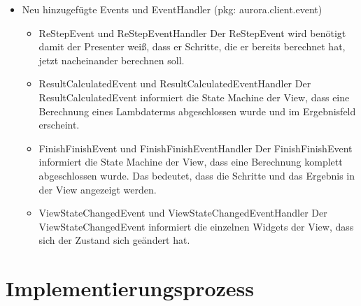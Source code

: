 \documentclass[parskip=full,11pt,twoside]{scrartcl}
\begin{document}
\begin{itemize}
    \item Neu hinzugefügte Events und EventHandler (pkg: aurora.client.event)
    	\begin{itemize}
    		\item ReStepEvent und ReStepEventHandler
    		\newline
    		Der ReStepEvent wird benötigt damit der Presenter weiß, dass er Schritte, die er bereits berechnet hat, jetzt nacheinander berechnen soll.

    		\item ResultCalculatedEvent und ResultCalculatedEventHandler
    		\newline
    		Der ResultCalculatedEvent informiert die State Machine der View, dass eine Berechnung eines Lambdaterms abgeschlossen wurde und im Ergebnisfeld erscheint.

    		\item FinishFinishEvent und FinishFinishEventHandler
    		\newline
    		Der FinishFinishEvent informiert die State Machine der View, dass eine Berechnung komplett abgeschlossen wurde. Das bedeutet, dass die Schritte und das Ergebnis in der View angezeigt werden.

    		\item ViewStateChangedEvent und ViewStateChangedEventHandler
    		\newline
    		Der ViewStateChangedEvent informiert die einzelnen Widgets der View, dass sich der Zustand sich geändert hat.

    	\end{itemize}
\end{itemize}



\section{Implementierungsprozess}
\end{document}
